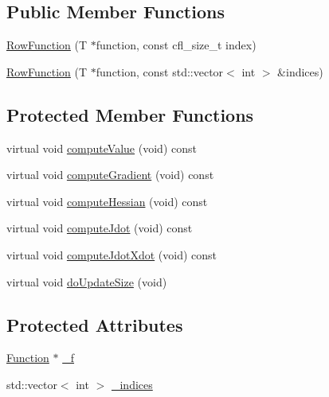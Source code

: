 \subsection*{Public Member Functions}
\begin{DoxyCompactItemize}
\item 
\hyperlink{classocra_1_1RowFunction_aed18ba241ac62a2c8013593f424b60d5}{Row\+Function} (T $\ast$function, const cfl\+\_\+size\+\_\+t index)
\item 
\hyperlink{classocra_1_1RowFunction_a19b2063d4ec61b91fdd8793321414f7d}{Row\+Function} (T $\ast$function, const std\+::vector$<$ int $>$ \&indices)
\end{DoxyCompactItemize}
\subsection*{Protected Member Functions}
\begin{DoxyCompactItemize}
\item 
virtual void \hyperlink{classocra_1_1RowFunction_a92329f7b26227d2dad0ee60ade2e35c6}{compute\+Value} (void) const 
\item 
virtual void \hyperlink{classocra_1_1RowFunction_abb67612051fe46179a57991a08c50a5c}{compute\+Gradient} (void) const 
\item 
virtual void \hyperlink{classocra_1_1RowFunction_ace0af1a5af604e98a2c36a7a0811a7b9}{compute\+Hessian} (void) const 
\item 
virtual void \hyperlink{classocra_1_1RowFunction_a4736f858a2e29ffcba418e8b2ff12491}{compute\+Jdot} (void) const 
\item 
virtual void \hyperlink{classocra_1_1RowFunction_ad2c0c6617aaa92fe932e01c286f60f23}{compute\+Jdot\+Xdot} (void) const 
\item 
virtual void \hyperlink{classocra_1_1RowFunction_ae2072d38459752174b456af8497da969}{do\+Update\+Size} (void)
\end{DoxyCompactItemize}
\subsection*{Protected Attributes}
\begin{DoxyCompactItemize}
\item 
\hyperlink{classocra_1_1Function}{Function} $\ast$ \hyperlink{classocra_1_1RowFunction_a336ba922ce93c2c1357b4298acfd0c2b}{\+\_\+f}
\item 
std\+::vector$<$ int $>$ \hyperlink{classocra_1_1RowFunction_afaa713596ca3c785cd9bb7599518ab0e}{\+\_\+indices}
\end{DoxyCompactItemize}


